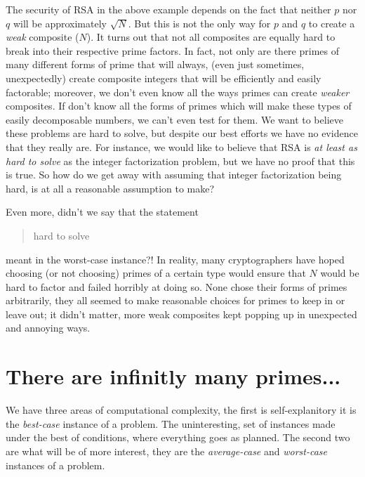 The security of RSA in the above example depends on the fact that neither $p$ nor $q$ will be approximately $\sqrt{N}$. But this is not the only way for $p$ and $q$ to create a \emph{weak} composite ($N$). It turns out that not all composites are equally hard to break into their respective prime factors. In fact, not only are there primes of many different forms of prime that will always, (even just sometimes, unexpectedly) create composite integers that will be efficiently and easily factorable; moreover, we don't even know all the ways primes can create \emph{weaker} composites. If don't know all the forms of primes which will make these types of easily decomposable numbers, we can't even test for them. We want to believe these problems are hard to solve, but despite our best efforts we have no evidence that they really are. For instance, we would like to believe that RSA is \emph{at least as hard to solve} as the integer factorization problem, but we have no proof that this is true. 
\newline
So how do we get away with assuming that integer factorization being hard, is at all a reasonable assumption to make?
\medskip

Even more, didn't we say that the statement \begin{quotation} hard to solve \end{quotation} meant in the worst-case instance?!
\newline
In reality, many cryptographers have hoped choosing (or not choosing) primes of a certain type would ensure that $N$ would be hard to factor and failed horribly at doing so. None chose their forms of primes arbitrarily, they all seemed to make reasonable choices for primes to keep in or leave out; it didn't matter, more weak composites kept popping up in unexpected and annoying ways. 
\newline

\section*{There are infinitly many primes...}
\newline

We have three areas of computational complexity, the first is self-explanitory it is the \emph{best-case} instance of a problem. The uninteresting, set of instances made under the best of conditions, where everything goes as planned. The second two are what will be of more interest, they are the \emph{average-case} and \emph{worst-case} instances of a problem. 
\bigskip

